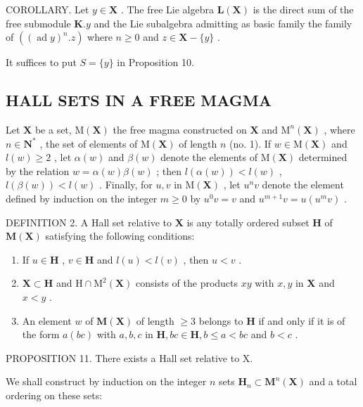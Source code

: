 COROLLARY. Let \(y \in \mathbf{X}\) . The free Lie algebra \(\mathbf{L}(\mathbf{X})\) is the direct sum of the free submodule \(\mathbf{K}.y\) and the Lie subalgebra admitting as basic family the family of \(((\operatorname{ad}y)^n.z)\) where \(n \geqslant 0\) and \(z \in \mathbf{X} - \{y\}\) .

It suffices to put \(S = \{y\}\) in Proposition 10.

\subsection{HALL SETS IN A FREE MAGMA}

Let \(\mathbf{X}\) be a set, \(\mathrm{M}(\mathbf{X})\) the free magma constructed on \(\mathbf{X}\) and \(\mathrm{M}^n (\mathbf{X})\) , where \(n\in \mathbf{N}^*\) , the set of elements of \(\mathrm{M}(\mathbf{X})\) of length \(n\) (no. 1). If \(w\in \mathrm{M}(\mathbf{X})\) and \(l(w)\geqslant 2\) , let \(\alpha (w)\) and \(\beta (w)\) denote the elements of \(\mathrm{M}(\mathbf{X})\) determined by the relation \(w = \alpha (w)\beta (w)\) ; then \(l(\alpha (w)) < l(w)\) , \(l(\beta (w)) < l(w)\) . Finally, for \(u,v\) in \(\mathrm{M}(\mathbf{X})\) , let \(u^n v\) denote the element defined by induction on the integer \(m\geqslant 0\) by \(u^{0}v = v\) and \(u^{m + 1}v = u(u^{m}v)\) .

DEFINITION 2. A Hall set relative to \(\mathbf{X}\) is any totally ordered subset \(\mathbf{H}\) of \(\mathbf{M}(\mathbf{X})\) satisfying the following conditions:

\begin{enumerate}
\def\labelenumi{(\Alph{enumi})}
\item
  If \(u \in \mathbf{H}\) , \(v \in \mathbf{H}\) and \(l(u) < l(v)\) , then \(u < v\) .
\item
  \(\mathbf{X} \subset \mathbf{H}\) and \(\mathrm{H} \cap \mathrm{M}^2(\mathbf{X})\) consists of the products \(xy\) with \(x, y\) in \(\mathbf{X}\) and \(x < y\) .
\item
  An element \(w\) of \(\mathbf{M}(\mathbf{X})\) of length \(\geqslant 3\) belongs to \(\mathbf{H}\) if and only if it is of the form \(a(bc)\) with \(a, b, c\) in \(\mathbf{H}, bc \in \mathbf{H}, b \leqslant a < bc\) and \(b < c\) .
\end{enumerate}

PROPOSITION 11. There exists a Hall set relative to X.

We shall construct by induction on the integer \(n\) sets \(\mathbf{H}_n \subset \mathbf{M}^n(\mathbf{X})\) and a total ordering on these sets:

